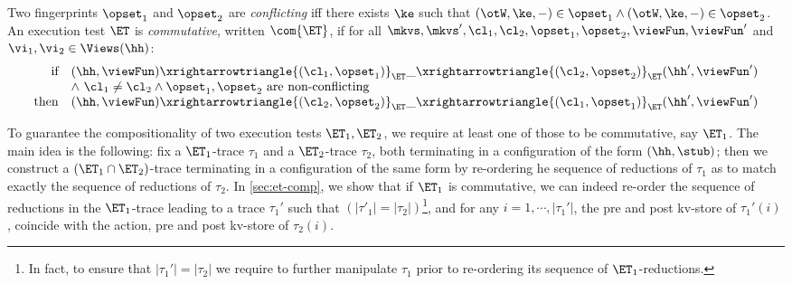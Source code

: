 \begin{definition}
Two fingerprints $\opset_1$ and $\opset_2$ are \emph{conflicting} 
iff there exists $\ke$ such that 
$(\otW, \ke, -) \in \opset_1 \land (\otW, \ke, -) \in \opset_2$. 
An execution test $\ET$ is \emph{commutative}, written $\com{\ET}$, if 
for all \( \mkvs, \mkvs', \cl_1, \cl_2, \opset_1, \opset_2, \viewFun, \viewFun'\) and \( \vi_1, \vi_2 \in \Views(\hh) \):
\[
\begin{array}{@{}r @{\hspace{10pt}} l @{}}
	\text{if} &  
	(\hh, \viewFun) \xrightarrowtriangle{(\cl_1, \opset_1)}_{\ET} 
	\_ \xrightarrowtriangle{(\cl_2, \opset_2)}_{\ET} (\hh', \viewFun') \\
	& \land\ \cl_1 \ne \cl_2 \land \opset_1, \opset_2  \text{ are non-conflicting}\\
%
%	
	\text{then} & (\hh, \viewFun) \xrightarrowtriangle{(\cl_2, \opset_2)}_{\ET} 
\_ \xrightarrowtriangle{(\cl_1, \opset_1)}_{\ET} (\hh', \viewFun')
\end{array}
\]
\end{definition}

To guarantee the compositionality of two execution tests $\ET_1, \ET_2$, we 
require at least one of those to be commutative, say $\ET_1$. The main idea 
is the following: fix a $\ET_1$-trace $\tau_1$ and a $\ET_2$-trace $\tau_2$, both terminating in a configuration 
of the form $(\hh, \stub)$; then we construct a $(\ET_1 \cap \ET_2)$-trace terminating 
in a configuration of the same form by re-ordering he sequence of 
reductions of $\tau_1$ as to match exactly the sequence of 
reductions of $\tau_2$. 
In \cref{sec:et-comp}, we show that if $\ET_1$ is commutative, 
we can indeed re-order the sequence of reductions in the 
$\ET_1$-trace leading to a trace $\tau_1'$ such that $(\lvert \tau'_1 \rvert = \lvert \tau_2 \rvert)$\footnote{In fact, 
to ensure that $\lvert \tau_1' \rvert = \lvert \tau_2 \rvert$ we require to further manipulate 
$\tau_1$ prior to re-ordering its sequence of $\ET_1$-reductions.}, 
and for any 
$i=1,\cdots, \lvert \tau_1'\rvert$, the pre and post kv-store of $\tau_1'(i)$,
 coincide with the action, pre and post kv-store 
of $\tau_2(i)$.

